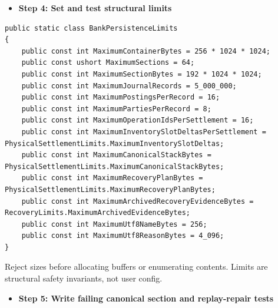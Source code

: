 \documentclass[
  10pt,
  letterpaper,
]{article}
\providecommand{\tightlist}{%
  \setlength{\itemsep}{0pt}\setlength{\parskip}{0pt}}
\begin{document}
\begin{itemize}
\tightlist
\item[$\square$]
  \textbf{Step 4: Set and test structural limits}
\end{itemize}

\begin{lstlisting}
public static class BankPersistenceLimits
{
    public const int MaximumContainerBytes = 256 * 1024 * 1024;
    public const ushort MaximumSections = 64;
    public const int MaximumSectionBytes = 192 * 1024 * 1024;
    public const int MaximumJournalRecords = 5_000_000;
    public const int MaximumPostingsPerRecord = 16;
    public const int MaximumPartiesPerRecord = 8;
    public const int MaximumOperationIdsPerSettlement = 16;
    public const int MaximumInventorySlotDeltasPerSettlement = PhysicalSettlementLimits.MaximumInventorySlotDeltas;
    public const int MaximumCanonicalStackBytes = PhysicalSettlementLimits.MaximumCanonicalStackBytes;
    public const int MaximumRecoveryPlanBytes = PhysicalSettlementLimits.MaximumRecoveryPlanBytes;
    public const int MaximumArchivedRecoveryEvidenceBytes = RecoveryLimits.MaximumArchivedEvidenceBytes;
    public const int MaximumUtf8NameBytes = 256;
    public const int MaximumUtf8ReasonBytes = 4_096;
}
\end{lstlisting}

Reject sizes before allocating buffers or enumerating contents. Limits
are structural safety invariants, not user config.

\begin{itemize}
\tightlist
\item[$\square$]
  \textbf{Step 5: Write failing canonical section and replay-repair
  tests}
\end{itemize}
\end{document}
